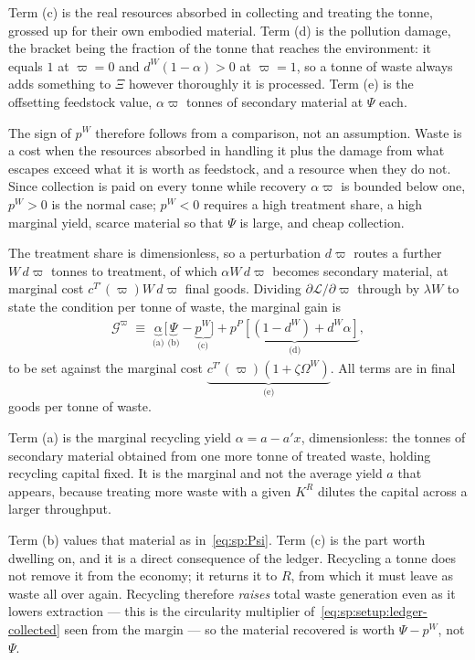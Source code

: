 Term (c) is the real resources absorbed in collecting and treating the tonne, grossed up for their own embodied material. Term (d) is the pollution damage, the bracket being the fraction of the tonne that reaches the environment: it equals $1$ at $\varpi=0$ and $d^W\left(1-\alpha\right)>0$ at $\varpi=1$, so a tonne of waste always adds something to $\Xi$ however thoroughly it is processed. Term (e) is the offsetting feedstock value, $\alpha\varpi$ tonnes of secondary material at $\Psi$ each.

The sign of $p^W$ therefore follows from a comparison, not an assumption. Waste is a cost when the resources absorbed in handling it plus the damage from what escapes exceed what it is worth as feedstock, and a resource when they do not. Since collection is paid on every tonne while recovery $\alpha\varpi$ is bounded below one, $p^W>0$ is the normal case; $p^W<0$ requires a high treatment share, a high marginal yield, scarce material so that $\Psi$ is large, and cheap collection.

 The treatment share is dimensionless, so a perturbation $d\varpi$ routes a further $W\,d\varpi$ tonnes to treatment, of which $\alpha W\,d\varpi$ becomes secondary material, at marginal cost $c^{T\prime}\left(\varpi\right)W\,d\varpi$ final goods. Dividing $\partial\mathcal L/\partial\varpi$ through by $\lambda W$ to state the condition per tonne of waste, the marginal gain is
\begin{align}
\mathcal G^\varpi \;\equiv\;
\underbrace{\alpha}_{\text{(a)}}\Big[\underbrace{\Psi}_{\text{(b)}}-\underbrace{p^W}_{\text{(c)}}\Big]
+\underbrace{p^P\left[\left(1-d^W\right)+d^W\alpha\right]}_{\text{(d)}} ,
\label{eq:sp:foc:varpi-gain}
\end{align}
to be set against the marginal cost $\underbrace{c^{T\prime}\left(\varpi\right)\left(1+\zeta\Omega^W\right)}_{\text{(e)}}$. All terms are in final goods per tonne of waste.

Term (a) is the marginal recycling yield $\alpha=a-a'x$, dimensionless: the tonnes of secondary material obtained from one more tonne of treated waste, holding recycling capital fixed. It is the marginal and not the average yield $a$ that appears, because treating more waste with a given $K^R$ dilutes the capital across a larger throughput.

Term (b) values that material as in~\eqref{eq:sp:Psi}. Term (c) is the part worth dwelling on, and it is a direct consequence of the ledger. Recycling a tonne does not remove it from the economy; it returns it to $R$, from which it must leave as waste all over again. Recycling therefore \emph{raises} total waste generation even as it lowers extraction --- this is the circularity multiplier of~\eqref{eq:sp:setup:ledger-collected} seen from the margin --- so the material recovered is worth $\Psi-p^W$, not $\Psi$.

